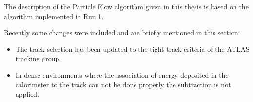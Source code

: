 The description of the Particle Flow algorithm given in this thesis is based on the algorithm implemented in Run 1.

Recently some changes were included and are briefly mentioned in this section:

\begin{itemize}
\item The track selection has been updated to the tight track criteria of the ATLAS tracking group.
\item In dense environments where the association of energy deposited in the calorimeter to the track can not be done properly the subtraction is not applied.

\end{itemize}


